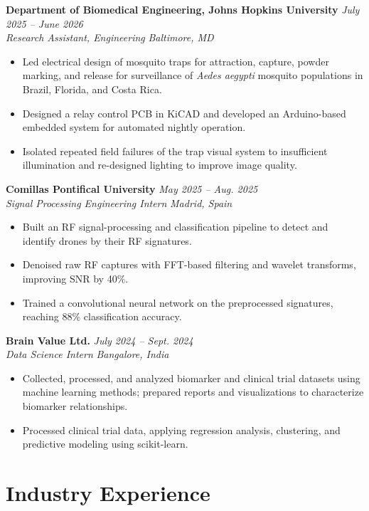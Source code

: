 \documentclass[10.5pt,letterpaper]{article}
\newcommand{\tightlist}{\vspace{-9pt}}
\newcommand{\jobhead}[4]{%
  \noindent\textbf{#1} \hfill \textit{#2}\\
  \noindent\textit{#3} \hfill \textit{#4}\\[-0.15em]
}
\begin{document}
\jobhead{Department of Biomedical Engineering, Johns Hopkins University}{July 2025 -- June 2026}{Research Assistant, Engineering}{Baltimore, MD}
\tightlist
\begin{itemize}
  \item Led electrical design of mosquito traps for attraction, capture, powder marking, and release for surveillance of \textit{Aedes aegypti} mosquito populations in Brazil, Florida, and Costa Rica.
  \item Designed a relay control PCB in KiCAD and developed an Arduino-based embedded system for automated nightly operation.
  \item Isolated repeated field failures of the trap visual system to insufficient illumination and re-designed lighting to improve image quality.
\end{itemize}

\jobhead{Comillas Pontifical University}{May 2025 -- Aug. 2025}{Signal Processing Engineering Intern}{Madrid, Spain}
\tightlist
\begin{itemize}
  \item Built an RF signal-processing and classification pipeline to detect and identify drones by their RF signatures.
  \item Denoised raw RF captures with FFT-based filtering and wavelet transforms, improving SNR by 40\%.
  \item Trained a convolutional neural network on the preprocessed signatures, reaching 88\% classification accuracy.
\end{itemize}

\jobhead{Brain Value Ltd.}{July 2024 -- Sept. 2024}{Data Science Intern}{Bangalore, India}
\tightlist
\begin{itemize}
  \item Collected, processed, and analyzed biomarker and clinical trial datasets using machine learning methods; prepared reports and visualizations to characterize biomarker relationships.
  \item Processed clinical trial data, applying regression analysis, clustering, and predictive modeling using scikit-learn.
\end{itemize}

\section{Industry Experience}
\end{document}
